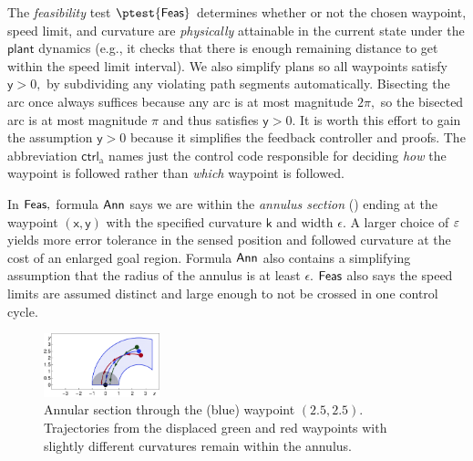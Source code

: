 \documentclass[12pt]{cmuthesis}
\theoremstyle{definition}
\theoremstyle{remark}
\newcommand{\xgvar}{\textsf{x}}
\newcommand{\ygvar}{\textsf{y}}
\newcommand{\kvar}{\textsf{k}}
\newcommand{\ctrl}{\textsf{ctrl}\xspace}
\newcommand{\ctrlliv}{\ctrl_{\text{a}}}
\newcommand{\plant}{\textsf{plant}\xspace}
\newcommand{\rref}[2][]{\prettyref{#2}}
\begin{document}
The \emph{feasibility} test $\ptest{\planreq}$ determines whether or not the chosen waypoint, speed limit, and curvature are \emph{physically} attainable in the current state under the $\plant$ dynamics (e.g., it checks that there is enough remaining distance to get within the speed limit interval).
We also simplify plans so all waypoints satisfy $\ygvar > 0,$ by subdividing any violating path segments automatically.
Bisecting the arc once always suffices because any arc is at most magnitude $2\pi,$ so the bisected arc is at most magnitude $\pi$ and thus satisfies $\ygvar > 0$.
It is worth this effort to gain the assumption $\ygvar > 0$ because it simplifies the feedback controller and proofs.
The abbreviation $\ctrlliv$ names just the control code responsible for deciding \emph{how} the waypoint is followed rather than \emph{which} waypoint is followed.


In $\textsf{Feas},$ formula $\textsf{Ann}$ says we are within the \emph{annulus section} (\rref{fig:circlestaging}) ending at the waypoint $(\xgvar, \ygvar)$ with the specified curvature $\kvar$ and width $\epsilon$.
A larger choice of $\varepsilon$ yields more error tolerance in the sensed position and followed curvature at the cost of an enlarged goal region.
Formula $\textsf{Ann}$ also contains a simplifying assumption that the radius of the annulus is at least $\epsilon$.
$\textsf{Feas}$ also says the speed limits are assumed distinct and large enough to not be crossed in one control cycle.

\begin{figure}[h!]
\centering
\includegraphics[width=0.3\textwidth]{graphics/fig-ode3.pdf}
\caption{Annular section through the (blue) waypoint $(2.5,2.5)$. Trajectories from the displaced green and red waypoints with slightly different curvatures remain within the annulus.}\label{fig:circlestaging}
\label{fig:circlestaging}
\end{figure}
\end{document}
